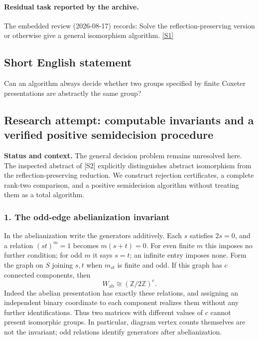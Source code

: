\documentclass[11pt,a4paper]{article}
\newcommand{\sref}[2]{\hyperlink{source:#1:#2}{[S#2]}}
\begin{document}
\paragraph{Residual task reported by the archive.}

The embedded review (2026-08-17) records: Solve the reflection-preserving version or otherwise give a general isomorphism algorithm. \sref{1192}{1}

\subsection{Short English statement}

Can an algorithm always decide whether two groups specified by finite Coxeter presentations are abstractly the same group?

\subsection{Research attempt: computable invariants and a verified positive semidecision procedure}
\textbf{Status and context.} The general decision problem remains unresolved here. The inspected abstract of [S2] explicitly distinguishes abstract isomorphism from the reflection-preserving reduction. We construct rejection certificates, a complete rank-two comparison, and a positive semidecision algorithm without treating them as a total algorithm.

\subsubsection{1. The odd-edge abelianization invariant}
In the abelianization write the generators additively. Each $s$ satisfies $2s=0$, and a relation $(st)^m=1$ becomes $m(s+t)=0$. For even finite $m$ this imposes no further condition; for odd $m$ it says $s=t$; an infinite entry imposes none. Form the graph on $S$ joining $s,t$ when $m_{st}$ is finite and odd. If this graph has $c$ connected components, then
\[W_{\mathrm{ab}}\cong(\mathbb Z/2\mathbb Z)^c.\tag{1}\]
Indeed the abelian presentation has exactly these relations, and assigning an independent binary coordinate to each component realizes them without any further identifications. Thus two matrices with different values of $c$ cannot present isomorphic groups. In particular, diagram vertex counts themselves are not the invariant; odd relations identify generators after abelianization.
\end{document}
